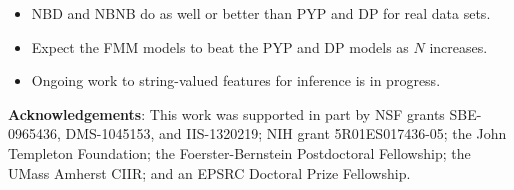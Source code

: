 \documentclass[portrait,a0b,final]{a0poster}
\newenvironment{poster}{
  \begin{center}
  \begin{minipage}[c]{0.98\textwidth}
}{
  \end{minipage}
  \end{center}
}
\begin{document}
\begin{poster}
\begin{multicols}{3}
\begin{itemize}
\item NBD and NBNB do as well or better than PYP and DP for real data sets.
\item Expect the FMM models to beat the PYP and DP models as $N$ increases. 
\item Ongoing work to string-valued features for inference is in progress.
\end{itemize}

\textbf{Acknowledgements}: This work was supported in
part by NSF grants SBE-0965436, DMS-1045153, and IIS-1320219; NIH
grant 5R01ES017436-05; the John Templeton Foundation; the
Foerster-Bernstein Postdoctoral Fellowship; the UMass Amherst CIIR;
and an EPSRC Doctoral Prize Fellowship.

\scriptsize{


}
\phantom{.}
\end{multicols}



\end{poster}
\end{document}
